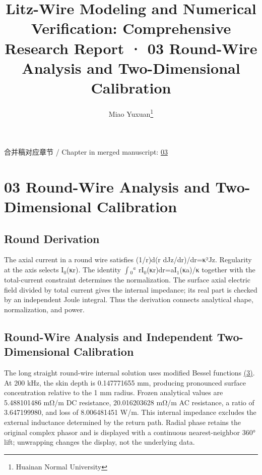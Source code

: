 \documentclass[journal,10pt]{IEEEtran}
\begin{document}
\title{Litz-Wire Modeling and Numerical Verification: Comprehensive Research Report · 03 Round-Wire Analysis and Two-Dimensional Calibration}
\author{Miao Yuxuan\thanks{Huainan Normal University}}

\maketitle
\noindent 合并稿对应章节 / Chapter in merged manuscript: \href{report_en_ieee.pdf#chapter-03}{03}\par
\FloatBarrier
\section*{03 Round-Wire Analysis and Two-Dimensional Calibration}
\hypertarget{chapter-03}{}
\subsection*{Round Derivation}
\hypertarget{03.round_derivation.heading}{}
The axial current in a round wire satisfies (1/r)d(r dJz/dr)/dr=κ²Jz. Regularity at the axis selects I\(_0\)(κr). The identity \(\int\)\(_0\)\(^a\) rI\(_0\)(κr)dr=aI\(_1\)(κa)/κ together with the total-current constraint determines the normalization. The surface axial electric field divided by total current gives the internal impedance; its real part is checked by an independent Joule integral. Thus the derivation connects analytical shape, normalization, and power.


\subsection*{Round-Wire Analysis and Independent Two-Dimensional Calibration}
\hypertarget{03.analytic.heading}{}
The long straight round-wire internal solution uses modified Bessel functions \href{report_en_ieee.pdf#E03}{(3)}. At 200 kHz, the skin depth is 0.147771655 mm, producing pronounced surface concentration relative to the 1 mm radius. Frozen analytical values are 5.488101486 mΩ/m DC resistance, 20.016203628 mΩ/m AC resistance, a ratio of 3.647199980, and loss of 8.006481451 W/m. This internal impedance excludes the external inductance determined by the return path. Radial phase retains the original complex phasor and is displayed with a continuous nearest-neighbor 360° lift; unwrapping changes the display, not the underlying data.
\end{document}
